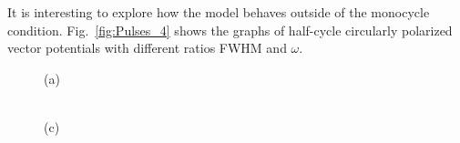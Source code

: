 It is interesting to explore how the model behaves outside of the monocycle condition. Fig.~\ref{fig:Pulses_4} shows the graphs of half-cycle circularly polarized vector potentials with different ratios FWHM and $\omega$.
\begin{figure}[h!]
\begin{minipage}[h]{0.5\linewidth}
 (a) \\
\end{minipage}
\hfill
\begin{minipage}[h]{0.5\linewidth}
 \\(c)
\end{minipage}
\begin{minipage}[h]{0.5\linewidth}

\end{minipage}
\end{figure}

